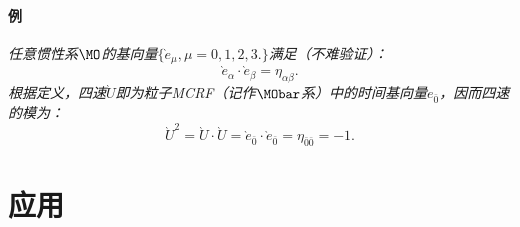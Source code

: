 \paragraph{例}
{\it 任意惯性系$\MO$的基向量$\{ \grave{e}_\mu, \mu = 0, 1, 2, 3.\}$满足（不难验证）：
\begin{equation}
    \grave{e}_\alpha \cdot \grave{e}_\beta = \eta_{\alpha \beta}.
\end{equation}
根据定义，四速$\grave{U}$即为粒子MCRF（记作$\MObar$系）中的时间基向量$\grave{e}_{\bar{0}}$，因而四速的模为：
\begin{equation}
    \grave{U}^2 = \grave{U} \cdot \grave{U} = \grave{e}_{\bar{0}} \cdot \grave{e}_{\bar{0}} = \eta_{\bar{0} \bar{0}} = -1.
\end{equation}
}

\section{应用}